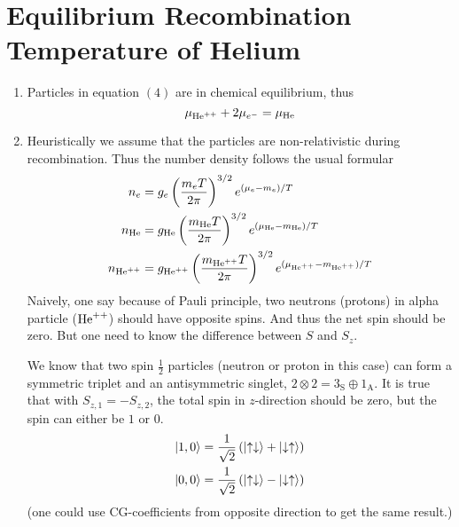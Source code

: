 \section{Equilibrium Recombination Temperature of Helium}
\begin{enumerate}[label=(\alph*)]
   \item Particles in equation $(4)$ are in chemical equilibrium, thus
      \begin{equation}
         \mu_{\text{He}^{++}} + 2 \mu_{e^-} = \mu_{\text{He}}
      \end{equation}
   \item Heuristically we assume that the particles are non-relativistic during recombination. Thus the number density follows the usual formular
      \begin{align}
         n_e &= g_e \left( \frac{m_e T}{2\pi} \right)^{3/2} e^{(\mu_e - m_e)/T} \label{math:ne}\\
         n_{\text{He}} &= g_{\text{He}} \left( \frac{m_{\text{He}} T}{2\pi} \right)^{3/2} e^{(\mu_{\text{He}} - m_{\text{He}})/T} \label{math:nHe} \\
         n_{\text{He}^{++}} &= g_{\text{He}^{++}} \left( \frac{m_{\text{He}^{++}} T}{2\pi} \right)^{3/2} e^{(\mu_{\text{He}^{++}} - m_{\text{He}^{++}})/T} \label{math:nHepp}
      \end{align}
      Naively, one say because of Pauli principle, two neutrons (protons) in alpha particle (${\text{He}^{++}}$) should have opposite spins. And thus the net spin should be zero. But one need to know the difference between $S$ and $S_z$.

      We know that two spin $\frac{1}{2}$ particles (neutron or proton in this case) can form a symmetric triplet and an antisymmetric singlet, $ 2 \otimes 2 = 3_\text{S} \oplus 1_{\text{A}}$. It is true that with $S_{z,1} = - S_{z,2}$, the total spin in $z$-direction should be zero, but the spin can either be $1$ or $0$.
      \begin{align*}
         \ket{ 1, 0} &= \frac{1}{\sqrt{2}} \left( \ket{\uparrow \downarrow} + \ket{\downarrow \uparrow } \right) \\
         \ket{ 0, 0} &= \frac{1}{\sqrt{2}} \left( \ket{\uparrow \downarrow} - \ket{\downarrow \uparrow } \right)
      \end{align*}
      (one could use CG-coefficients from opposite direction to get the same result.)


\end{enumerate}

